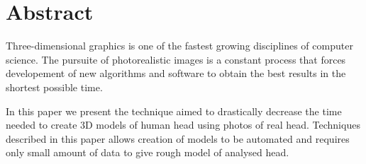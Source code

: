 %
%
\section*{Abstract}
Three-dimensional graphics is one of the fastest growing disciplines of
computer science. The pursuite of photorealistic images is a constant
process that forces developement of new algorithms and software to obtain the
best results in the shortest possible time.

In this paper we present the technique aimed to drastically decrease the time
needed to create 3D models of human head using photos of real head. Techniques
described in this paper allows creation of models to be automated and
requires only small amount of data to give rough model of analysed head.